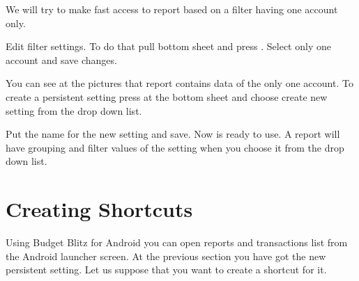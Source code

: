 \documentclass[a4paper,10pt,english]{sphinxmanual}
\begin{document}
\noindent{}

\noindent{}

\noindent{}

\sphinxAtStartPar
We will try to make fast access to  report based on a filter having one account only.

\sphinxAtStartPar
Edit filter settings. To do that pull bottom sheet and press . Select only one account
and save changes.

\noindent{}

\noindent{}

\noindent{}

\sphinxAtStartPar
You can see at the pictures that report contains data of the only one account. To create
a persistent setting press  at the bottom sheet
and choose create new setting from the drop down list.

\noindent{}

\noindent{}

\noindent{}

\sphinxAtStartPar
Put the name  for the new setting and save. Now
 is ready to use. A report will have
grouping and filter values of the setting when you choose it from the
drop down list.

\noindent{}

\noindent{}


\section{Creating Shortcuts}
\label{\detokenize{shortcuts:creating-shortcuts}}
\sphinxAtStartPar
Using Budget Blitz for Android you can open reports and transactions list from the Android launcher screen. At the previous
section you have got the new persistent setting. Let us suppose that you want to create a shortcut for it.
\end{document}
